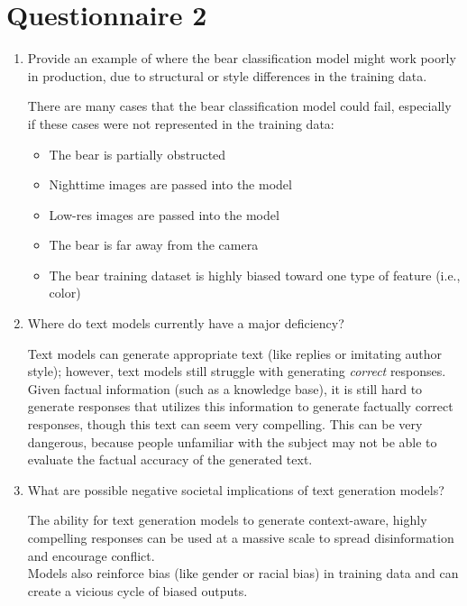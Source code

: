 \documentclass[12pt,a4paper]{article}
\begin{document}
\raggedright

\section*{Questionnaire 2}

\begin{enumerate}
\item Provide an example of where the bear classification model might work poorly in production, due to structural or style differences in the training data. \\

\smallbreak

There are many cases that the bear classification model could fail, especially if these cases were not represented in the training data:
\begin{itemize}
\item The bear is partially obstructed
\item Nighttime images are passed into the model
\item Low-res images are passed into the model
\item The bear is far away from the camera
\item The bear training dataset is highly biased toward one type of feature (i.e., color)
\end{itemize}

\bigbreak

\item Where do text models currently have a major deficiency? \\

\smallbreak

Text models can generate appropriate text (like replies or imitating author style); however, text models still struggle with generating \textit{correct} responses. Given factual information (such as a knowledge base), it is still hard to generate responses that utilizes this information to generate factually correct responses, though this text can seem very compelling. This can be very dangerous, because people unfamiliar with the subject may not be able to evaluate the factual accuracy of the generated text.

\bigbreak

\item What are possible negative societal implications of text generation models? \\

\smallbreak

The ability for text generation models to generate context-aware, highly compelling responses can be used at a massive scale to spread disinformation and encourage conflict. \\
\smallbreak
Models also reinforce bias (like gender or racial bias) in training data and can create a vicious cycle of biased outputs.


\end{enumerate}
\end{document}
